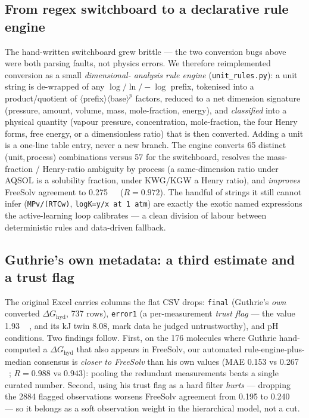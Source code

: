\documentclass[11pt]{article}
\newcommand{\dGhyd}{\ensuremath{\Delta G_{\mathrm{hyd}}}}
\newcommand{\kcal}{\,\mathrm{kcal\,mol^{-1}}}
\begin{document}
\subsection{From regex switchboard to a declarative rule engine}
\label{sec:rules}
The hand-written switchboard grew brittle --- the two conversion bugs above were both parsing
faults, not physics errors. We therefore reimplemented conversion as a small \emph{dimensional-
analysis rule engine} (\texttt{unit\_rules.py}): a unit string is de-wrapped of any
$\log/\ln/{-}\log$ prefix, tokenised into a product/quotient of $\langle$prefix$\rangle\langle$base$\rangle^{p}$
factors, reduced to a net dimension signature (pressure, amount, volume, mass, mole-fraction,
energy), and \emph{classified} into a physical quantity (vapour pressure, concentration,
mole-fraction, the four Henry forms, free energy, or a dimensionless ratio) that is then converted.
Adding a unit is a one-line table entry, never a new branch. The engine converts \num{65} distinct
(unit,\,process) combinations versus \num{57} for the switchboard, resolves the mass-fraction /
Henry-ratio ambiguity by process (a same-dimension ratio under AQSOL is a solubility fraction, under
KWG/KGW a Henry ratio), and \emph{improves} FreeSolv agreement to \SI{0.275}{\kcal} ($R=0.972$). The
handful of strings it still cannot infer (\texttt{MPv/(RTCw)}, \texttt{logK=y/x at 1 atm}) are exactly
the exotic named expressions the active-learning loop calibrates --- a clean division of labour
between deterministic rules and data-driven fallback.

\subsection{Guthrie's own metadata: a third estimate and a trust flag}
\label{sec:meta}
The original Excel carries columns the flat CSV drops: \texttt{final} (Guthrie's \emph{own}
converted $\dGhyd$, \num{737} rows), \texttt{error1} (a per-measurement \emph{trust flag} --- the
value \SI{1.93}{\kcal}, and its kJ twin \num{8.08}, mark data he judged untrustworthy), and pH
conditions. Two findings follow. First, on the \num{176} molecules where Guthrie hand-computed a
$\dGhyd$ that also appears in FreeSolv, our automated rule-engine-plus-median consensus is
\emph{closer to FreeSolv} than his own values (MAE \SI{0.153}{} vs \SI{0.267}{\kcal}; $R=0.988$ vs
$0.943$): pooling the redundant measurements beats a single curated number. Second, using his trust
flag as a hard filter \emph{hurts} --- dropping the \num{2884} flagged observations worsens FreeSolv
agreement from \SI{0.195}{} to \SI{0.240}{\kcal} --- so it belongs as a soft observation weight in
the hierarchical model, not a cut.
\end{document}
